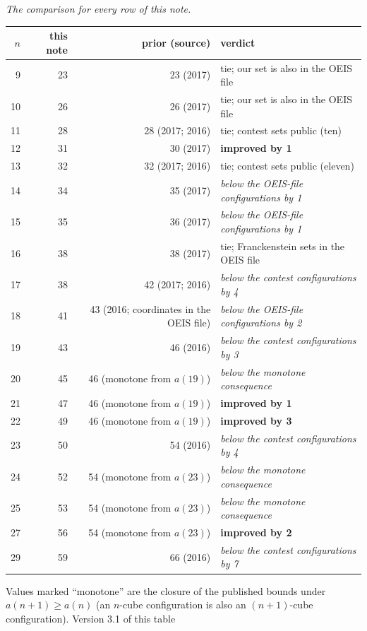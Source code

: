 \documentclass[11pt,a4paper]{article}
\begin{document}
\emph{The comparison for every row of this note.}
\begin{center}
\begin{tabular}{rrrl}
\toprule
$n$ & this note & prior (source) & verdict\\
\midrule
 9 & 23 & 23 (2017) & tie; our set is also in the OEIS file\\
10 & 26 & 26 (2017) & tie; our set is also in the OEIS file\\
11 & 28 & 28 (2017; 2016) & tie; contest sets public (ten)\\
12 & 31 & 30 (2017) & \textbf{improved by 1}\\
13 & 32 & 32 (2017; 2016) & tie; contest sets public (eleven)\\
14 & 34 & 35 (2017) & \emph{below the OEIS-file configurations by 1}\\
15 & 35 & 36 (2017) & \emph{below the OEIS-file configurations by 1}\\
16 & 38 & 38 (2017) & tie; Franckenstein sets in the OEIS file\\
17 & 38 & 42 (2017; 2016) & \emph{below the contest configurations by 4}\\
18 & 41 & 43 (2016; coordinates in the OEIS file) & \emph{below the OEIS-file configurations by 2}\\
19 & 43 & 46 (2016) & \emph{below the contest configurations by 3}\\
20 & 45 & 46 (monotone from $a(19)$) & \emph{below the monotone consequence}\\
21 & 47 & 46 (monotone from $a(19)$) & \textbf{improved by 1}\\
22 & 49 & 46 (monotone from $a(19)$) & \textbf{improved by 3}\\
23 & 50 & 54 (2016) & \emph{below the contest configurations by 4}\\
24 & 52 & 54 (monotone from $a(23)$) & \emph{below the monotone consequence}\\
25 & 53 & 54 (monotone from $a(23)$) & \emph{below the monotone consequence}\\
27 & 56 & 54 (monotone from $a(23)$) & \textbf{improved by 2}\\
29 & 59 & 66 (2016) & \emph{below the contest configurations by 7}\\
\bottomrule
\end{tabular}
\end{center}
Values marked ``monotone'' are the closure of the published bounds under $a(n+1)\ge a(n)$
(an $n$-cube configuration is also an $(n+1)$-cube configuration).  Version 3.1 of this table
\end{document}
